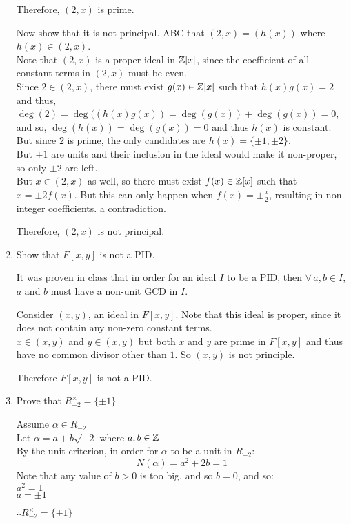 \documentclass[letterpaper,12pt,fleqn]{article}
\renewcommand{\a}{\alpha}
\newcommand{\x}{\times}
\begin{document}
\begin{enumerate}
  Therefore, $(2,x)$ is prime.

  Now show that it is not principal. ABC that $(2,x)=(h(x))$ where $h(x)\in(2,x)$. \\
  Note that $(2,x)$ is a proper ideal in $\mathbb{Z}[x]$, since the coefficient of all constant
  terms in $(2,x)$ must be even. \\
  Since $2\in(2,x)$, there must exist $g(x)\in\mathbb{Z}[x]$ such that $h(x)g(x)=2$ and thus, \\
  $\deg(2)=\deg((h(x)g(x))=\deg(g(x))+\deg(g(x))=0$, and so,
  $\deg(h(x))=\deg(g(x))=0$ and thus $h(x)$ is constant. \\
  But since $2$ is prime, the only candidates are $h(x)=\{\pm1,\pm2\}$. \\
  But $\pm1$ are units and their inclusion in the ideal would make it non-proper, so
  only $\pm2$ are left. \\
  But $x\in(2,x)$ as well, so there must exist $f(x)\in\mathbb{Z}[x]$ such that $x=\pm2f(x)$.
  But this can only happen when $f(x)=\pm\frac{x}{2}$, resulting in non-integer
  coefficients. a contradiction.

  Therefore, $(2,x)$ is not principal.

\item Show that $F[x,y]$ is not a PID.

  It was proven in class that in order for an ideal $I$ to be a PID, then
  $\forall\,a,b\in I$, $a$ and $b$ must have a non-unit GCD in $I$.

  Consider $(x,y)$, an ideal in $F[x,y]$. Note that this ideal is proper, since it does
  not contain any non-zero constant terms. \\
  $x\in(x,y)$ and $y\in(x,y)$ but both $x$ and $y$ are prime in $F[x,y]$ and thus have
  no common divisor other than $1$. So $(x,y)$ is not principle.

  Therefore $F[x,y]$ is not a PID.

\item Prove that $R_{-2}^{\x}=\{\pm1\}$

  Assume $\a\in R_{-2}$ \\
  Let $\a=a+b\sqrt{-2}$ where $a,b\in\mathbb{Z}$ \\
  By the unit criterion, in order for $\a$ to be a unit in $R_{-2}$:
  \[N(\a)=a^2+2b=1\]
  Note that any value of $b>0$ is too big, and so $b=0$, and so: \\
  $a^2=1$ \\
  $a=\pm1$

  $\therefore R_{-2}^{\x}=\{\pm1\}$
  

\end{enumerate}
\end{document}

